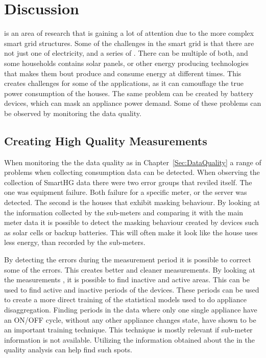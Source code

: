 \chapter{Discussion}

 is an area of research that is gaining a lot of attention due to the more complex smart grid structures. Some of the challenges in the smart grid is that there are not just one  of electricity, and a series of . There can be multiple of both, and some households contains solar panels, or other energy producing technologies that makes them bout produce and consume energy at different times. This creates challenges for some of the  applications, as it can camouflage the true power consumption of the houses. The same problem can be created by battery devices, which can mask an appliance power demand. Some of these problems can be observed by monitoring the data quality.

\section{Creating High Quality Measurements}
When monitoring the the data quality as in Chapter~\ref{Sec:DataQuality} a range of problems when collecting consumption data can be detected. When observing the collection of SmartHG data there were two error groups that reviled itself. The one was equipment failure. Both failure for a specific meter, or the server was detected. The second is the houses that exhibit masking behaviour. By looking at the information collected by the sub-meters and comparing it with the main meter data it is possible to detect the masking behaviour created by devices such as solar cells or backup batteries. This will often make it look like the house uses less energy, than recorded by the sub-meters. 

By detecting the errors during the measurement period it is possible to correct some of the errors. This creates better and cleaner measurements. By looking at the measurements , it is possible to find inactive and active areas. This can be used to find active and inactive periods of the devices. These periods can be used to create a more direct training of the statistical models used to do appliance disaggregation. Finding periods in the data where only one single appliance have an ON/OFF cycle, without any other appliance changes state, have shown to be an important training technique. This technique is mostly relevant if sub-meter information is not available. Utilizing the information obtained about the  in the quality analysis can help find such spots.

